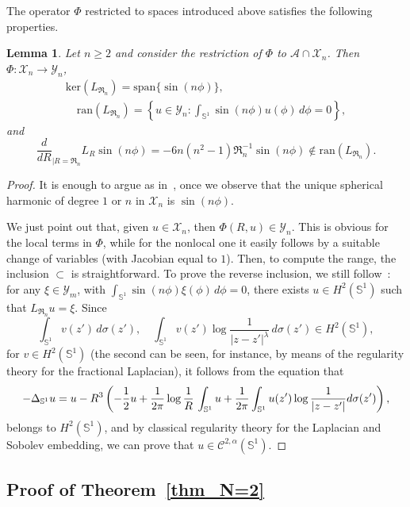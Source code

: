 \documentclass[10pt,reqno,english]{amsart}
\newcommand{\Su}{\mathbb{S}^1}
\newcommand{\rn}{{\mathfrak R}_n  }
\newtheorem{lemma}{Lemma}[section]
\theoremstyle{definition}
\numberwithin{equation}{section}
\begin{document}
The operator $\Phi$ restricted to spaces introduced above satisfies the following properties. 

\begin{lemma}
\label{lemma:bif2d1}
Let $n\ge2$ and consider the restriction of $\Phi$ to $\mathcal A\cap\mathcal X_n$. Then $\Phi:\mathcal X_n\to \mathcal Y_n$,
\begin{gather*}
\mathrm{ker}( L_{\rn})=\mathrm{span}\{\sin(n\phi)\},\\
\quad\mathrm{ran}(L_{\rn})=\left\{u\in\mathcal Y_n:\int_{\Su}\sin(n\phi)u(\phi)\,d\phi=0\right\},
\end{gather*}
and
\[
\frac{d}{dR}_{|R=\rn}L_R\sin(n\phi)=-6n(n^2-1)\rn^{-1} \sin(n\phi)\not\in\mathrm{ran}(L_{\rn}).
\]
\end{lemma}
\begin{proof}
 It is enough to argue as in~\cite[Proposition 9]{Fr19}, once we observe that the unique spherical harmonic of degree $1$ or $n$ in $\mathcal X_n$ is $\sin(n\phi)$.

We just point out that, given $u \in \mathcal X_n$, then $\Phi(R,u) \in \mathcal Y_n$. This is obvious for the local terms in $\Phi$, while for the nonlocal one it easily follows by a suitable change of variables (with Jacobian equal to $1$).
Then, to compute the range, the inclusion $\subset$ is straightforward. To prove the reverse inclusion, we still follow~\cite{Fr19}: for any $\xi \in\mathcal Y_m$, with $\int_{\Su}\sin(n\phi)\xi(\phi)\,d\phi=0$, there exists $u \in H^2(\Su)$ such that $L_{\rn}u = \xi$. Since
\[
 \int_{\mathbb{S}^1} v(z')\,d\sigma(z'),\quad\int_{\mathbb S^1} v (z')\log\frac{1}{|z-z'|^\lambda }\,d\sigma(z') \in H^2(\Su),
\]
for $v \in H^2(\Su)$ (the second can be seen, for instance, by means of the regularity theory for the fractional Laplacian), it follows from the equation that
\[
- \Delta_{\mathbb{S}^1} u = u - R^3 \left( -{1\over 2} u + {1\over 2\pi} \log {1\over R} \, \int_{\mathbb{S}^1} u + {1\over 2\pi}  \int_{\mathbb{S}^1} u(z') \log {1\over |z-z'|} d\sigma (z')\right),
\]
belongs to $H^2(\Su)$, and by classical regularity theory for the Laplacian and Sobolev embedding, we can prove that $u \in \mathcal C^{2,\alpha}(\Su)$.
\end{proof}



\subsection{Proof of Theorem\texorpdfstring{~\ref{thm_N=2}}{ 2}}
\end{document}
